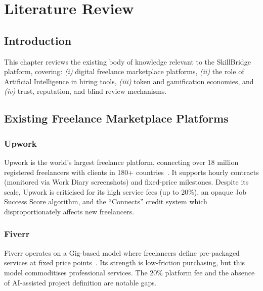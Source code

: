 
\chapter{Literature Review}
\label{Chapter2}

\section{Introduction}

This chapter reviews the existing body of knowledge relevant to the SkillBridge platform,
covering: \textit{(i)} digital freelance marketplace platforms, \textit{(ii)} the role of
Artificial Intelligence in hiring tools, \textit{(iii)} token and gamification economies,
and \textit{(iv)} trust, reputation, and blind review mechanisms.

\section{Existing Freelance Marketplace Platforms}

\subsection{Upwork}

Upwork is the world's largest freelance platform, connecting over 18 million registered
freelancers with clients in 180+ countries~\citep{Upwork2023}. It supports hourly
contracts (monitored via Work Diary screenshots) and fixed-price milestones. Despite its
scale, Upwork is criticised for its high service fees (up to 20\%), an opaque Job Success
Score algorithm, and the ``Connects'' credit system which disproportionately affects new
freelancers.

\subsection{Fiverr}

Fiverr operates on a Gig-based model where freelancers define pre-packaged services at fixed
price points~\citep{Fiverr2023}. Its strength is low-friction purchasing, but this model
commoditises professional services. The 20\% platform fee and the absence of AI-assisted
project definition are notable gaps.

